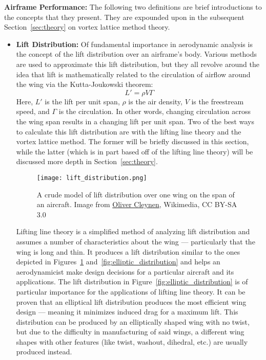 \documentclass{article}
\begin{document}
\textbf{Airframe Performance:} The following two definitions are brief introductions to the concepts that they present. They are expounded upon in the subsequent Section~\ref{sec:theory} on vortex lattice method theory.
\begin{itemize}
    \item[] \textbf{Lift Distribution:}
    Of fundamental importance in aerodynamic analysis is the concept of the lift distribution over an airframe's body. Various methods are used to approximate this lift distribution, but they all revolve around the idea that lift is mathematically related to the circulation of airflow around the wing via the Kutta-Joukowski theorem:
    \begin{equation}\label{eq:kutta_Joukowski} 
        L' = \rho V \Gamma
    \end{equation}
    Here, $L'$ is the lift per unit span, $\rho$ is the air density, $V$ is the freestream speed, and $\Gamma$ is the circulation.
    In other words, changing circulation across the wing span results in a changing lift per unit span. Two of the best ways to calculate this lift distribution are with the lifting line theory and the vortex lattice method. The former will be briefly discussed in this section, while the latter (which is in part based off of the lifting line theory) will be discussed more depth in Section~\ref{sec:theory}.
        \begin{figure}[H]
            \hspace*{\dimexpr\labelsep+\labelwidth}
            \begin{minipage}{0.915\linewidth}
                \centering
                \texttt{[image: lift\_distribution.png]}
                \captionsetup{width=\linewidth}
                \caption{A crude model of lift distribution over one wing on the span of an aircraft. Image from 
                \href{https://commons.wikimedia.org/wiki/File:Lift\_distribution\_over\_a\_three-dimensional\_wing\_\%281\%29.svg}{Oliver Cleynen}, Wikimedia, CC BY-SA 3.0}\label{fig:lift_distribution}
            \end{minipage}
        \end{figure}
    Lifting line theory is a simplified method of analyzing lift distribution and assumes a number of characteristics about the wing --- particularly that the wing is long and thin. It produces a lift distribution similar to the ones depicted in Figures~\ref{fig:lift_distribution} and~\ref{fig:elliptic_distribution} and helps an aerodynamicist make design decisions for a particular aircraft and its applications.
    The lift distribution in Figure~\ref{fig:elliptic_distribution} is of particular importance for the applications of lifting line theory. It can be proven that an elliptical lift distribution produces the most efficient wing design --- meaning it minimizes induced drag for a maximum lift. This distribution can be produced by an elliptically shaped wing with no twist, but due to the difficulty in manufacturing of said wings, a different wing shapes with other features (like twist, washout, dihedral, etc.) are usually produced instead.


\end{itemize}
\end{document}
